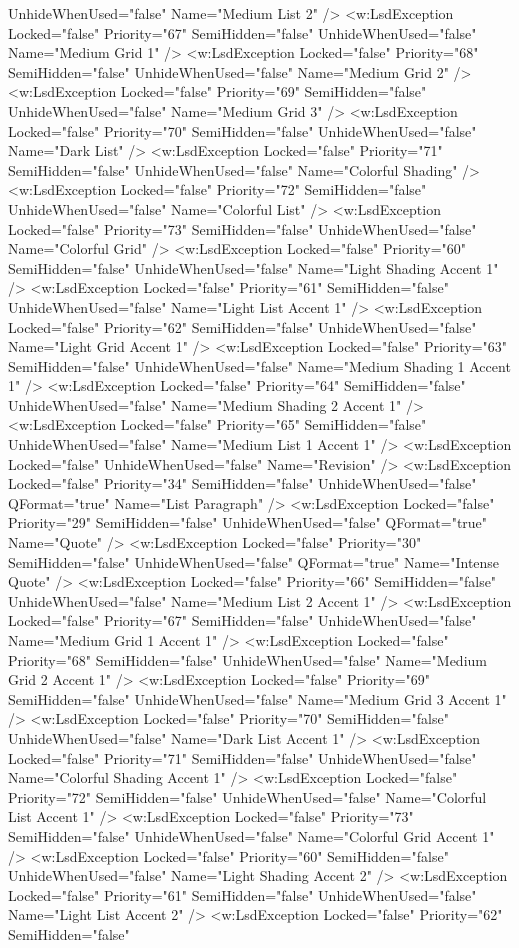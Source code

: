 UnhideWhenUsed="false" Name="Medium List 2" /> <w:LsdException Locked="false" Priority="67" SemiHidden="false"    UnhideWhenUsed="false" Name="Medium Grid 1" /> <w:LsdException Locked="false" Priority="68" SemiHidden="false"    UnhideWhenUsed="false" Name="Medium Grid 2" /> <w:LsdException Locked="false" Priority="69" SemiHidden="false"    UnhideWhenUsed="false" Name="Medium Grid 3" /> <w:LsdException Locked="false" Priority="70" SemiHidden="false"    UnhideWhenUsed="false" Name="Dark List" /> <w:LsdException Locked="false" Priority="71" SemiHidden="false"    UnhideWhenUsed="false" Name="Colorful Shading" /> <w:LsdException Locked="false" Priority="72" SemiHidden="false"    UnhideWhenUsed="false" Name="Colorful List" /> <w:LsdException Locked="false" Priority="73" SemiHidden="false"    UnhideWhenUsed="false" Name="Colorful Grid" /> <w:LsdException Locked="false" Priority="60" SemiHidden="false"    UnhideWhenUsed="false" Name="Light Shading Accent 1" /> <w:LsdException Locked="false" Priority="61" SemiHidden="false"    UnhideWhenUsed="false" Name="Light List Accent 1" /> <w:LsdException Locked="false" Priority="62" SemiHidden="false"    UnhideWhenUsed="false" Name="Light Grid Accent 1" /> <w:LsdException Locked="false" Priority="63" SemiHidden="false"    UnhideWhenUsed="false" Name="Medium Shading 1 Accent 1" /> <w:LsdException Locked="false" Priority="64" SemiHidden="false"    UnhideWhenUsed="false" Name="Medium Shading 2 Accent 1" /> <w:LsdException Locked="false" Priority="65" SemiHidden="false"    UnhideWhenUsed="false" Name="Medium List 1 Accent 1" /> <w:LsdException Locked="false" UnhideWhenUsed="false" Name="Revision" /> <w:LsdException Locked="false" Priority="34" SemiHidden="false"    UnhideWhenUsed="false" QFormat="true" Name="List Paragraph" /> <w:LsdException Locked="false" Priority="29" SemiHidden="false"    UnhideWhenUsed="false" QFormat="true" Name="Quote" /> <w:LsdException Locked="false" Priority="30" SemiHidden="false"    UnhideWhenUsed="false" QFormat="true" Name="Intense Quote" /> <w:LsdException Locked="false" Priority="66" SemiHidden="false"    UnhideWhenUsed="false" Name="Medium List 2 Accent 1" /> <w:LsdException Locked="false" Priority="67" SemiHidden="false"    UnhideWhenUsed="false" Name="Medium Grid 1 Accent 1" /> <w:LsdException Locked="false" Priority="68" SemiHidden="false"    UnhideWhenUsed="false" Name="Medium Grid 2 Accent 1" /> <w:LsdException Locked="false" Priority="69" SemiHidden="false"    UnhideWhenUsed="false" Name="Medium Grid 3 Accent 1" /> <w:LsdException Locked="false" Priority="70" SemiHidden="false"    UnhideWhenUsed="false" Name="Dark List Accent 1" /> <w:LsdException Locked="false" Priority="71" SemiHidden="false"    UnhideWhenUsed="false" Name="Colorful Shading Accent 1" /> <w:LsdException Locked="false" Priority="72" SemiHidden="false"    UnhideWhenUsed="false" Name="Colorful List Accent 1" /> <w:LsdException Locked="false" Priority="73" SemiHidden="false"    UnhideWhenUsed="false" Name="Colorful Grid Accent 1" /> <w:LsdException Locked="false" Priority="60" SemiHidden="false"    UnhideWhenUsed="false" Name="Light Shading Accent 2" /> <w:LsdException Locked="false" Priority="61" SemiHidden="false"    UnhideWhenUsed="false" Name="Light List Accent 2" /> <w:LsdException Locked="false" Priority="62" SemiHidden="false"    